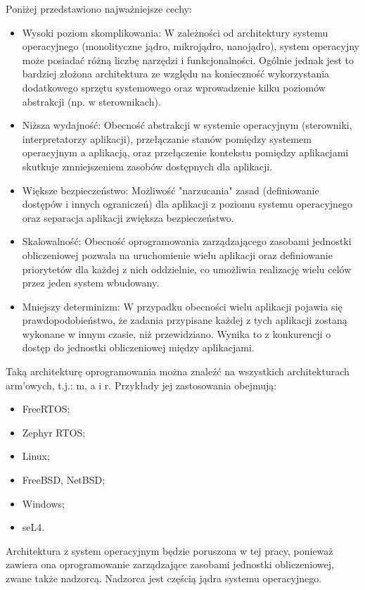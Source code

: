 \documentclass[../../main]{subfiles}
\begin{document}
Poniżej przedstawiono najważniejsze cechy:
\begin{itemize}
    \item Wysoki poziom skomplikowania: W zależności od architektury systemu operacyjnego (monolityczne jądro, mikrojądro, nanojądro), system operacyjny może posiadać różną liczbę narzędzi i funkcjonalności. Ogólnie jednak jest to bardziej złożona architektura ze względu na konieczność wykorzystania dodatkowego sprzętu systemowego oraz wprowadzenie kilku poziomów abstrakcji (np. w sterownikach).
    \item Niższa wydajność: Obecność abstrakcji w systemie operacyjnym (sterowniki,     interpretatorzy aplikacji), przełączanie stanów pomiędzy systemem operacyjnym a aplikacją, oraz przełączenie kontekstu pomiędzy aplikacjami skutkuje zmniejszeniem zasobów dostępnych dla aplikacji.
    \item Większe bezpieczeństwo: Możliwość "narzucania" zasad (definiowanie dostępów i innych ograniczeń) dla aplikacji z poziomu systemu operacyjnego oraz separacja aplikacji zwiększa bezpieczeństwo.
    \item Skalowalność: Obecność oprogramowania zarządzającego zasobami jednostki obliczeniowej pozwala na uruchomienie wielu aplikacji oraz definiowanie priorytetów dla każdej z nich oddzielnie, co umożliwia realizację wielu celów przez jeden system wbudowany.
    \item Mniejszy determinizm: W przypadku obecności wielu aplikacji pojawia się prawdopodobieństwo, że zadania przypisane każdej z tych aplikacji zostaną wykonane w innym czasie, niż przewidziano. Wynika to z konkurencji o dostęp do jednostki obliczeniowej między aplikacjami.
\end{itemize}

Taką architekturę oprogramowania można znaleźć na wszystkich architekturach \gls{arm}'owych,  t.j.: \gls{m}, \gls{a} i \gls{r}. Przykłady jej zastosowania obejmują:

\begin{itemize}
    \item FreeRTOS;
    \item Zephyr RTOS;
    \item Linux;
    \item FreeBSD, NetBSD;
    \item Windows;
    \item seL4.
\end{itemize}

Architektura z system operacyjnym będzie poruszona w tej pracy, ponieważ zawiera ona oprogramowanie zarządzające zasobami jednostki obliczeniowej, zwane także nadzorcą. Nadzorca jest częścią jądra systemu operacyjnego.
\end{document}
